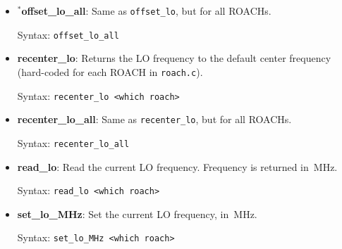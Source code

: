 \begin{itemize}[leftmargin=*,label={}]
\item $^{*}$\textbf{offset\_lo\_all}: Same as \texttt{offset\_lo}, but for all ROACHs.

Syntax: \texttt{offset\_lo\_all}

\item \textbf{recenter\_lo}: Returns the LO frequency to the default center frequency (hard-coded for each ROACH in \texttt{roach.c}).

Syntax: \texttt{recenter\_lo <which roach>}

\item \textbf{recenter\_lo\_all}: Same as \texttt{recenter\_lo}, but for all ROACHs.

Syntax: \texttt{recenter\_lo\_all}

\item \textbf{read\_lo}: Read the current LO frequency. Frequency is returned in~MHz.

Syntax: \texttt{read\_lo <which roach>}

\item \textbf{set\_lo\_MHz}: Set the current LO frequency, in~MHz.

Syntax: \texttt{set\_lo\_MHz <which roach>}

\end{itemize}

